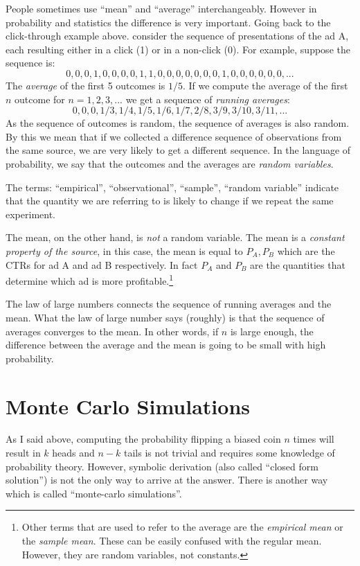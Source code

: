 People sometimes use ``mean'' and ``average'' interchangeably. However
in probability and statistics the difference is very important. Going back to the
click-through example above. consider the sequence of presentations of
the ad A, each resulting either in a click (1) or in a non-click
(0). For example, suppose the sequence is:
\[
0,0,0,1,0,0,0,0,1,1,0,0,0,0,0,0,0,1,0,0,0,0,0,0,...
\] 
The {\em average} of the first 5 outcomes is $1/5$. If we compute
the average of the first $n$ outcome for $n=1,2,3,...$ we get a
sequence of {\em running averages}:
\[
0,0,0,1/3,1/4,1/5,1/6,1/7,2/8,3/9,3/10,3/11,...
\]
As the sequence of outcomes is random, the sequence of averages is
also random. By this we mean that if we collected a difference
sequence of observations from the same source, we are very likely to
get a different sequence. In the language of probability, we say that
the outcomes and the averages are {\em random variables}.

The terms: ``empirical'', ``observational'', ``sample'', ``random
variable'' indicate that the quantity we are referring to is likely to
change if we repeat the same experiment.

The mean, on the other hand, is {\em not} a random variable. The mean
is a {\em constant property of the source}, in this case, the mean is
equal to $P_A,P_B$ which are the CTRs for ad A and ad B
respectively. In fact $P_A$ and $P_B$ are the quantities that
determine which ad is more profitable.\footnote{Other terms that are
  used to refer to the average are the {\em empirical mean} or the
  {\em sample mean}. These can be easily confused with the regular
  mean. However, they are random variables, not constants.}

The law of large numbers connects the sequence of running averages and
the mean. What the law of large number says (roughly) is that the
sequence of averages converges to the mean. In other words, if $n$ is
large enough, the difference between the average and the mean is going
to be small with high probability.

\section{Monte Carlo Simulations}
As I said above, computing the probability flipping a biased coin $n$
times will result in $k$ heads and $n-k$ tails is not
trivial and requires some knowledge of probability theory. However,
symbolic derivation (also called ``closed form solution'') is not the
only way to arrive at the answer. There is another way which is called
``monte-carlo simulations''.

